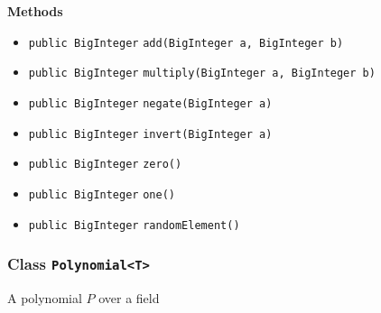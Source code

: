 \textbf{\sffamily Methods}
\begin{itemize}
\item \lstinline|public BigInteger| \lstinline|add|\lstinline|(BigInteger a, BigInteger b)| \\[-0.6em]




\item \lstinline|public BigInteger| \lstinline|multiply|\lstinline|(BigInteger a, BigInteger b)| \\[-0.6em]




\item \lstinline|public BigInteger| \lstinline|negate|\lstinline|(BigInteger a)| \\[-0.6em]




\item \lstinline|public BigInteger| \lstinline|invert|\lstinline|(BigInteger a)| \\[-0.6em]




\item \lstinline|public BigInteger| \lstinline|zero|\lstinline|()| \\[-0.6em]




\item \lstinline|public BigInteger| \lstinline|one|\lstinline|()| \\[-0.6em]




\item \lstinline|public BigInteger| \lstinline|randomElement|\lstinline|()| \\[-0.6em]




\end{itemize}

\subsubsection{Class \lstinline|Polynomial<T>|}
A polynomial $P$ over a field \\
\noindent\begin{minipage}[t]{5cm}
\vspace{0.3em}
\hspace*{2em}
\vspace{0.3em}
\end{minipage}

